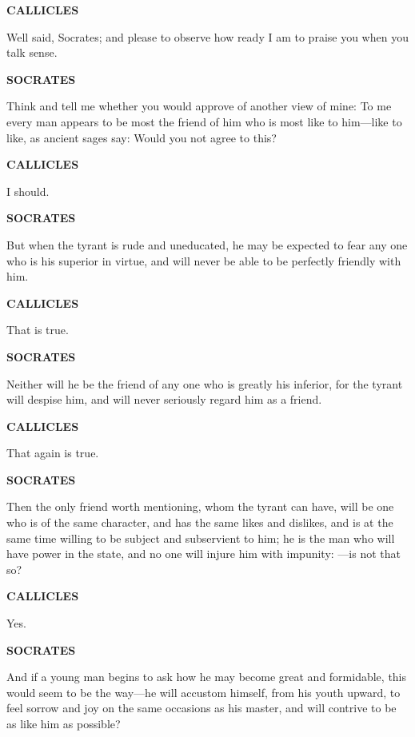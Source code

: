 \documentclass[11pt,letter]{article}
\begin{document}
\par \textbf{CALLICLES}
\par   Well said, Socrates; and please to observe how ready I am to praise you when you talk sense.

\par \textbf{SOCRATES}
\par   Think and tell me whether you would approve of another view of mine:  To me every man appears to be most the friend of him who is most like to him—like to like, as ancient sages say:  Would you not agree to this?

\par \textbf{CALLICLES}
\par   I should.

\par \textbf{SOCRATES}
\par   But when the tyrant is rude and uneducated, he may be expected to fear any one who is his superior in virtue, and will never be able to be perfectly friendly with him.

\par \textbf{CALLICLES}
\par   That is true.

\par \textbf{SOCRATES}
\par   Neither will he be the friend of any one who is greatly his inferior, for the tyrant will despise him, and will never seriously regard him as a friend.

\par \textbf{CALLICLES}
\par   That again is true.

\par \textbf{SOCRATES}
\par   Then the only friend worth mentioning, whom the tyrant can have, will be one who is of the same character, and has the same likes and dislikes, and is at the same time willing to be subject and subservient to him; he is the man who will have power in the state, and no one will injure him with impunity: —is not that so?

\par \textbf{CALLICLES}
\par   Yes.

\par \textbf{SOCRATES}
\par   And if a young man begins to ask how he may become great and formidable, this would seem to be the way—he will accustom himself, from his youth upward, to feel sorrow and joy on the same occasions as his master, and will contrive to be as like him as possible?
\end{document}
